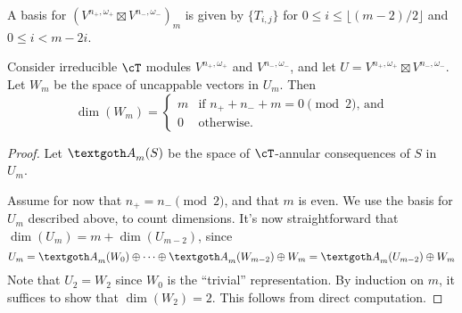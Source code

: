 \documentclass[12pt]{article}
\begin{document}
\begin{fact}
A basis for $\left(V^{n_+, \omega_+} \boxtimes V^{n_-, \omega_-}\right)_m$ is given by $\{T_{i,j}\}$ for $0 \leq i \leq \lfloor (m-2)/2 \rfloor$ and $0 \leq i < m - 2i$.
\end{fact}

\begin{lem}
Consider irreducible $\cT$ modules $V^{n_+, \omega_+}$ and $V^{n_-, \omega_-}$, and let $U=V^{n_+, \omega_+} \boxtimes V^{n_-, \omega_-}$.
Let $W_m$ be the space of uncappable vectors in $U_m$.
Then $$\dim(W_m)=\begin{cases} m & \text{if $n_+ + n_- + m = 0 \pmod 2$, and} \\ 0 & \text{otherwise.}\end{cases}$$
\end{lem}
\begin{proof}
Let $\gA_m(S)$ be the space of $\cT$-annular consequences of $S$ in $U_m$.

Assume for now that $n_+ = n_- \pmod 2$, and that $m$ is even. 
We use the basis for $U_m$ described above, to count dimensions.
It's now straightforward that $\dim(U_m)=m+\dim(U_{m-2})$, since
$$
U_{m}
=
\gA_m(W_0)\oplus\cdots\oplus \gA_m(W_{m-2})\oplus W_m 
= 
\gA_m(U_{m-2})\oplus W_m
$$
Note that $U_{2}=W_{2}$ since $W_{0}$ is the ``trivial'' representation. 
By induction on $m$, it suffices to show that $\dim(W_{2})=2$.  
This follows from direct computation.
\end{proof}
\end{document}
